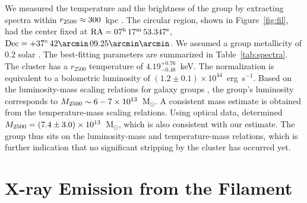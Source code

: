 \documentclass[11pt,a4paper,useAMS,iop]{emulateapj}
\begin{document}
We measured the temperature and the brightness of the group by extracting spectra within $r_{\rm 2500} \approx 300$~kpc \citep{Medezinski2013}. The circular region, shown in Figure~\ref{fig:fil}, had the center fixed at ${\rm RA} = 07^{\rm h}\, 17^{\rm m}\, 53.347^{\rm s}$, ${\rm Dec} = +37^{\circ}\, 42\arcmin \, 09.25\arcmin\arcmin$. We assumed a group metallicity of 0.2 solar \citep[e.g.,][]{Rasmussen2007}. The best-fitting parameters are summarized in Table~\ref{tab:spectra}. The cluster has a $r_{2500}$ temperature of $4.19_{-0.48}^{+0.76}$~keV. The normalization is equivalent to a bolometric luminosity of $(1.2\pm 0.1) \times 10^{44}$~erg~s$^{-1}$. Based on the luminosity-mass scaling relations for galaxy groups \citep[e.g.,][]{Connor2014}, the group's luminosity corresponds to $M_{\rm 2500} \sim 6-7\times 10^{13}$~M$_\odot$. A consistent mass estimate is obtained from the temperature-mass scaling relations.  Using optical data, \citet{Medezinski2013} determined $M_{\rm 2500} = (7.4\pm 3.0) \times 10^{13}$~M$_\odot$, which is also consistent with our estimate. The group thus sits on the luminosity-mass and temperature-mass relations, which is further indication that no significant stripping by the cluster has occurred yet.

\section{X-ray Emission from the Filament}
\label{sec:Filament}
\end{document}
